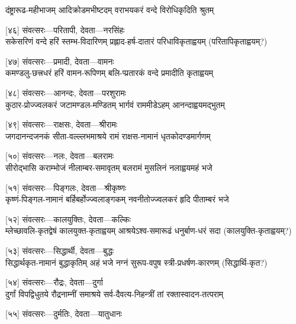 \twolineshloka
{दंष्ट्रारूढ-महीभाजम् आदिक्रोडमभीष्टदम्}
{वराभयकरं वन्दे विरोधिकृदिति श्रुतम्} %

[४६] संवत्सरः—परितापी, देवता—नरसिंहः\\

\twolineshloka
{सकेसरिणं वन्दे हरिं स्तम्भ-विदारिणम्}
{प्रह्लाद-हर्ष-दातारं परिधाविकृताह्वयम्} %
(परितापिकृताह्वयम्?)

[४७] संवत्सरः—प्रमादी, देवता—वामनः\\

\twolineshloka
{कमण्डलु-छत्त्रधरं हरिं वामन-रूपिणम्}
{बलि-प्प्रतारकं वन्दे प्रमादीति कृताह्वयम्} %

[४८] संवत्सरः—आनन्दः, देवता—परशुरामः\\

\twolineshloka
{कुठार-प्रोज्ज्वलकरं जटामण्डल-मण्डितम्}
{भार्गवं राममीडेऽहम् आनन्दाह्वयमद्भुतम्} %

[४९] संवत्सरः—राक्षसः, देवता—श्रीरामः\\

\twolineshloka
{जगदानन्दजनकं सीता-वल्ल्लभमाश्रये}
{रामं राक्षस-नामानं धृतकोदण्डमार्गणम्} %

[५०] संवत्सरः—नलः, देवता—बलरामः\\

\twolineshloka
{सीरोद्भासि कराम्भोजं नीलाम्बर-समावृतम्}
{बलरामं मुसलिनं नलाह्वयमहं भजे} %

[५१] संवत्सरः—पिङ्गलः, देवता—श्रीकृष्णः\\

\twolineshloka
{कृष्णं-पिङ्गल-नामानं बर्हिबर्होज्ज्वलाङ्गकम्}
{नवनीतोज्ज्वलकरं हृदि पीताम्बरं भजे} %

[५२] संवत्सरः—कालयुक्तिः, देवता—कल्किः\\

\twolineshloka
{म्लेच्छावलि-कृतद्वेषं कालयुक्त-कृताह्वयम्}
{आश्रयेऽश्व-समारूढं धनुर्बाण-धरं सदा} %
(कालयुक्ति-कृताह्वयम्?)

[५३] संवत्सरः—सिद्धार्थी, देवता—बुद्धः\\

\twolineshloka
{सिद्धार्थकृत-नामानं बुद्धाकृतिम् अहं भजे}
{नग्नं सुरूप-वपुष स्त्री-प्रधर्षण-कारणम्} %
(सिद्धार्थि-कृत?)

[५४] संवत्सरः—रौद्रः, देवता—दुर्गा\\

\twolineshloka
{दुर्गां विपद्विधुतये रौद्रनाम्नीं समाश्रये}
{सर्व-दैवत्य-निहन्त्रीं तां रक्तास्वादन-तत्पराम्} %

[५५] संवत्सरः—दुर्मतिः, देवता—यातुधानः\\

